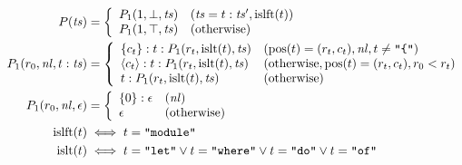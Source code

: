 \documentclass[12pt]{article}
\begin{document}
\pagestyle{empty}

\begin{align*}
    P(\mathit{ts}) &= \left\{\begin{array}{ll}
        P_1(1, \bot, \mathit{ts}) &(\mathit{ts} = t:\mathit{ts}', \mathrm{islft}(t)) \\
        P_1(1, \top, \mathit{ts}) &(\text{otherwise}) \\
    \end{array}\right. \\
    P_1(r_0, \mathit{nl}, t:\mathit{ts}) &= \left\{\begin{array}{ll}
        \{c_t\}:t:P_1(r_t, \mathrm{islt}(t), \mathit{ts}) &(\mathrm{pos}(t) = (r_t, c_t), \mathit{nl}, t \neq \texttt{\textquotedbl\{\textquotedbl}) \\
        \langle c_t\rangle:t:P_1(r_t, \mathrm{islt}(t), \mathit{ts}) &(\text{otherwise}, \mathrm{pos}(t) = (r_t, c_t), r_0 < r_t) \\
        t:P_1(r_t, \mathrm{islt}(t), \mathit{ts}) &(\text{otherwise})
    \end{array}\right. \\
    P_1(r_0, \mathit{nl}, \epsilon) &= \left\{\begin{array}{ll}
        \{0\}:\epsilon &(\mathit{nl}) \\
        \epsilon &(\text{otherwise})
    \end{array}\right. \\
    \mathrm{islft}(t) &\iff t = \texttt{\textquotedbl module\textquotedbl} \\
    \mathrm{islt}(t) &\iff
        t = \texttt{\textquotedbl let\textquotedbl}
        \lor t = \texttt{\textquotedbl where\textquotedbl}
        \lor t = \texttt{\textquotedbl do\textquotedbl}
        \lor t = \texttt{\textquotedbl of\textquotedbl}
\end{align*}
\end{document}
